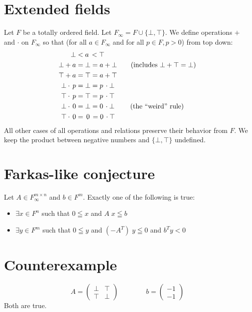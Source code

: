 \documentclass[]{article}
\begin{document}
\section {Extended fields}

Let $F$ be a totally ordered field.
Let $F_\infty = F \cup \{ \bot, \top \}$.
We define operations $+$ and $\cdot$ on $F_\infty$
so that
(for all $a \in F_\infty$ and for all $p \in F, p > 0$)
from top down:
\begin{align*}
	\bot <& \;a\, < \top \\
	\bot + a =& \;\bot = a + \bot \text{\qquad(includes $\bot + \top = \bot$)} \\
	\top + a =& \;\top = a + \top \\
	\bot \cdot\, p =& \;\bot = p \,\cdot \bot \\
	\top \cdot\, p =& \;\top = p \,\cdot \top \\
	\bot \cdot\, 0 =& \;\bot = 0 \,\cdot \bot \text{\qquad\;(the ``weird'' rule)} \\
	\top \cdot\, 0 =& \;\,0\, = 0 \,\cdot \top
\end{align*}
All other cases of all operations and relations
preserve their behavior from $F$.
We keep the product between negative numbers and
$\{ \bot, \top \}$ undefined.

\section{Farkas-like conjecture}

Let $A \in F_\infty^{m \times n}$ and $b \in F^m$.
Exactly one of the following is true:
\begin{itemize}
	\item $\exists x \in F^n$ such that
	$0 \leqq x$ and $A\; x \leqq b$
	\item $\exists y \in F^m$ such that
	$0 \leqq y$ and $(-A^T)\; y \leqq 0$ and $b^T y < 0$
\end{itemize}

\section{Counterexample}

$$
A =
\begin{pmatrix}
	\bot & \top\\
	\top & \bot
\end{pmatrix}
\qquad \qquad
b =
\begin{pmatrix}
	-1 \\
	-1
\end{pmatrix}
$$
Both are true.
\end{document}
